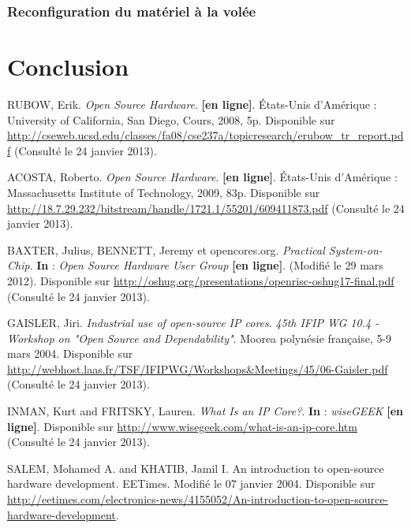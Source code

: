 \documentclass{report}
\begin{document}
\subsection{Reconfiguration du matériel à la volée}

\newpage

\chapter*{Conclusion}




\begin{thebibliography}{1}
  
RUBOW, Erik. \textit{Open Source Hardware}. \textbf{[en ligne]}. États-Unis d'Amérique : University of California, San Diego, Cours, 2008, 5p. Disponible sur \url{http://cseweb.ucsd.edu/classes/fa08/cse237a/topicresearch/erubow\_tr\_report.pdf} (Consulté le 24 janvier 2013).

ACOSTA, Roberto. \textit{Open Source Hardware}. \textbf{[en ligne]}. États-Unis d'Amérique : Massachusetts Institute of Technology, 2009, 83p. Disponible sur \url{http://18.7.29.232/bitstream/handle/1721.1/55201/609411873.pdf} (Consulté le 24 janvier 2013).

BAXTER, Julius, BENNETT, Jeremy et opencores.org. \textit{Practical System-on-Chip}. \textbf{In} : \textit{Open Source Hardware User Group} \textbf{[en ligne]}. (Modifié le 29 mars 2012). Disponible sur \url{http://oshug.org/presentations/openrisc-oshug17-final.pdf} (Consulté le 24 janvier 2013).

GAISLER, Jiri. \textit{Industrial use of open-source IP cores}. \textit{45th IFIP WG 10.4 - Workshop on "Open Source and Dependability"}. Moorea polynésie française, 5-9 mars 2004. Disponible sur \url{http://webhost.laas.fr/TSF/IFIPWG/Workshops\&Meetings/45/06-Gaisler.pdf} (Consulté le 24 janvier 2013).

INMAN, Kurt and FRITSKY, Lauren. \textit{What Is an IP Core?}. \textbf{In} : \textit{wiseGEEK} \textbf{[en ligne]}. Disponible sur \url{http://www.wisegeek.com/what-is-an-ip-core.htm} (Consulté le 24 janvier 2013).

SALEM, Mohamed A. and KHATIB, Jamil I. An introduction to open-source hardware development. EETimes. Modifié le 07 janvier 2004. Disponible sur \url{http://eetimes.com/electronics-news/4155052/An-introduction-to-open-source-hardware-development}.


\end{thebibliography}
\end{document}

